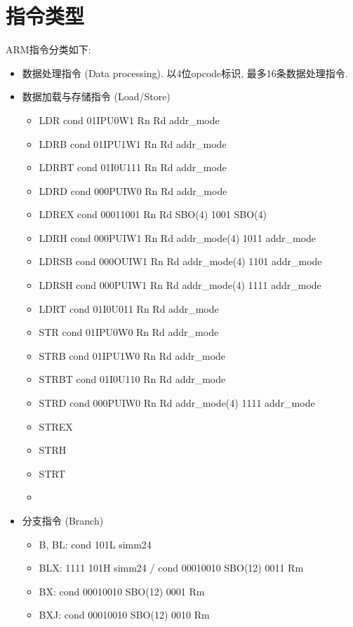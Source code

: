 \documentclass[10pt]{book}
\begin{document}
\section{指令类型}
ARM指令分类如下:
\begin{itemize}
  \item 数据处理指令 (Data processing). 以4位opcode标识, 最多16条数据处理指令.
  \item 数据加载与存储指令 (Load/Store)
  \begin{itemize}
    \item LDR    cond 01IPU0W1 Rn Rd addr\_mode
    \item LDRB   cond 01IPU1W1 Rn Rd addr\_mode
    \item LDRBT  cond 01I0U111 Rn Rd addr\_mode
    \item LDRD   cond 000PUIW0 Rn Rd addr\_mode
    \item LDREX  cond 00011001 Rn Rd SBO(4) 1001 SBO(4)
    \item LDRH   cond 000PUIW1 Rn Rd addr\_mode(4) 1011 addr\_mode
    \item LDRSB  cond 000OUIW1 Rn Rd addr\_mode(4) 1101 addr\_mode
    \item LDRSH  cond 000PUIW1 Rn Rd addr\_mode(4) 1111 addr\_mode
    \item LDRT   cond 01I0U011 Rn Rd addr\_mode
    \item STR    cond 01IPU0W0 Rn Rd addr\_mode
    \item STRB   cond 01IPU1W0 Rn Rd addr\_mode
    \item STRBT  cond 01I0U110 Rn Rd addr\_mode
    \item STRD   cond 000PUIW0 Rn Rd addr\_mode(4) 1111 addr\_mode
    \item STREX  
    \item STRH
    \item STRT
    \item 
  \end{itemize}
  \item 分支指令 (Branch)
  \begin{itemize}
    \item B, BL: cond 101L simm24
    \item BLX: 1111 101H simm24 / cond 00010010 SBO(12) 0011 Rm
    \item BX: cond 00010010 SBO(12) 0001 Rm
    \item BXJ: cond 00010010 SBO(12) 0010 Rm
  \end{itemize}
\end{itemize}
\end{document}
